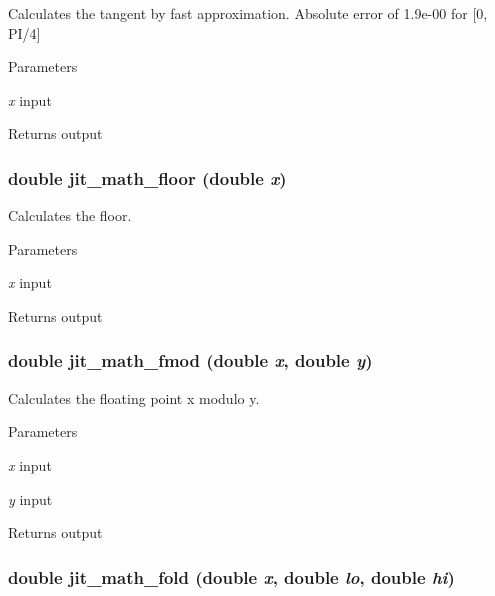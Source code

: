 Calculates the tangent by fast approximation. Absolute error of 1.9e-\/00 for \mbox{[}0, PI/4\mbox{]}


\begin{DoxyParams}{Parameters}
\item[{\em x}]input \end{DoxyParams}
\begin{DoxyReturn}{Returns}
output 
\end{DoxyReturn}
\hypertarget{group__mathmod_ga6a8abc7661ad637512d81cf1c9e6fdae}{
\subsubsection[{jit\_\-math\_\-floor}]{\setlength{\rightskip}{0pt plus 5cm}double jit\_\-math\_\-floor (double {\em x})}}
\label{group__mathmod_ga6a8abc7661ad637512d81cf1c9e6fdae}


Calculates the floor. 
\begin{DoxyParams}{Parameters}
\item[{\em x}]input \end{DoxyParams}
\begin{DoxyReturn}{Returns}
output 
\end{DoxyReturn}
\hypertarget{group__mathmod_gaab62faf04da0402ad53b5a3753c8ffb5}{
\subsubsection[{jit\_\-math\_\-fmod}]{\setlength{\rightskip}{0pt plus 5cm}double jit\_\-math\_\-fmod (double {\em x}, \/  double {\em y})}}
\label{group__mathmod_gaab62faf04da0402ad53b5a3753c8ffb5}


Calculates the floating point x modulo y. 
\begin{DoxyParams}{Parameters}
\item[{\em x}]input \item[{\em y}]input \end{DoxyParams}
\begin{DoxyReturn}{Returns}
output 
\end{DoxyReturn}
\hypertarget{group__mathmod_ga2187a488437b8bf2754eb096c032f85c}{
\subsubsection[{jit\_\-math\_\-fold}]{\setlength{\rightskip}{0pt plus 5cm}double jit\_\-math\_\-fold (double {\em x}, \/  double {\em lo}, \/  double {\em hi})}}
\label{group__mathmod_ga2187a488437b8bf2754eb096c032f85c}


